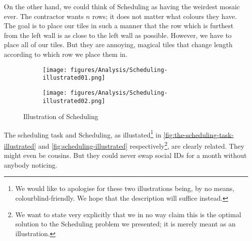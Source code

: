 On the other hand, we could think of Scheduling as having the weirdest mosaic ever. The contractor wants \(n\) rows; it does not matter what colours they have. The goal is to place our tiles in such a manner that the row which is furthest from the left wall is as close to the left wall as possible. However, we have to place all of our tiles. But they are annoying, magical tiles that change length according to which row we place them in.
\begin{figure}[H]
    \centering
    \begin{subfigure}[t]{0.715\textwidth}
        \centering
        \texttt{[image: figures/Analysis/Scheduling-illustrated01.png]}
    \end{subfigure}
    \hfill
    \begin{subfigure}[t]{0.25\textwidth}
        \centering
        \texttt{[image: figures/Analysis/Scheduling-illustrated02.png]}
    \end{subfigure}
    \caption{Illustration of Scheduling}
    \label{fig:scheduling-illustrated}
\end{figure}
The scheduling task and Scheduling, as illustated\footnote{We would like to apologise for these two illustrations being, by no means, colourblind-friendly. We hope that the description will suffice instead.} in \autoref{fig:the-scheduling-task-illustrated} and \autoref{fig:scheduling-illustrated} respectively\footnote{We want to state very explicitly that we in no way claim this is the optimal solution to the Scheduling problem we presented; it is merely meant as an illustration.}, are clearly related. They might even be cousins. But they could never swap social IDs for a month without anybody noticing.

